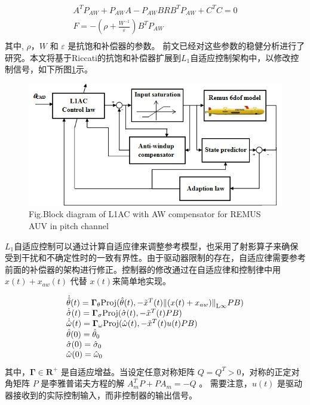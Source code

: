 \begin{equation}
\begin{array}{l}
 {A^T}{P_{AW}} + {P_{AW}}A - {P_{AW}}BR{B^T}{P_{AW}} + {C^T}C = 0 \\
 F =  - (\rho  + \frac{{{W^{ - 1}}}}{\varepsilon }){B^T}{P_{AW}} \\
\end{array}
\end{equation}
其中, $\rho$，$W$ 和 $\varepsilon$ 是抗饱和补偿器的参数。 前文已经对这些参数的稳健分析进行了研究。本文将基于Riccati的抗饱和补偿器扩展到$L_{1}$自适应控制架构中，以修改控制信号，如下所图\ref{fig:chap6:F6}示。
\begin{figure}[!htp]
 \centering
 \includegraphics[width=15cm]{figure/chap6/F1.jpg}
 \label{fig:chap6:F6}
  {Fig.}{Block diagram of L1AC with AW compensator for REMUS AUV in pitch channel}
 \end{figure}

$L_1$自适应控制可以通过计算自适应律来调整参考模型，也采用了射影算子来确保受到干扰和不确定性时的一致有界性。由于驱动器限制的存在，自适应律需要参考前面的补偿器的架构进行修正。控制器的修改通过在自适应律和控制律中用 $x(t)+ x_{aw}(t)$ 代替 $x(t)$来简单地实现。

\begin{equation}
\begin{array}{l}
 \dot {\hat {\theta }}(t) = {{\boldsymbol{\Gamma }}_\theta } {\rm{Proj}}(\hat \theta (t), - {{\tilde x}^T}(t){\left\| ({x(t)+x_{aw})} \right\|_{{\rm{L}}\infty }}PB) \\
 \dot {\hat {\sigma }}(t) = {{\boldsymbol{\Gamma }}_\sigma } {\rm{Proj}}(\hat \sigma (t), - {{\tilde x}^T}(t)PB) \\
 \dot {\hat {\omega }}(t) = {{\boldsymbol{\Gamma }}_\omega } {\rm{Proj}}(\hat \omega (t), - {{\tilde x}^T}(t)u(t)PB) \\
 \hat {\theta } (0)= {{\hat \theta }_0} \\
 \hat {\sigma } (0)= {{\hat \sigma }_0} \\
 \hat {\omega } (0)= {{\hat \omega }_0} \\
 \end{array}
 \end{equation}
其中，$\boldsymbol{\Gamma} \in {\mathbf{R}}^{ + }$ 是自适应增益。当设定任意对称矩阵 $Q=Q^{T}>0$，对称的正定对角矩阵 $P$ 是李雅普诺夫方程的解 $A_m^TP + P{A_m} =  - Q$ 。 需要注意，$u(t)$ 是驱动器接收到的实际控制输入，而非控制器的输出信号。


